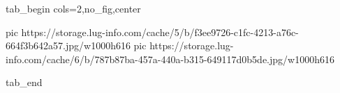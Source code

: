 
 
 
 
 

\ifcmt
  tab_begin cols=2,no_fig,center

     pic https://storage.lug-info.com/cache/5/b/f3ee9726-c1fc-4213-a76c-664f3b642a57.jpg/w1000h616
		 pic https://storage.lug-info.com/cache/6/b/787b87ba-457a-440a-b315-649117d0b5de.jpg/w1000h616

  tab_end
\fi
